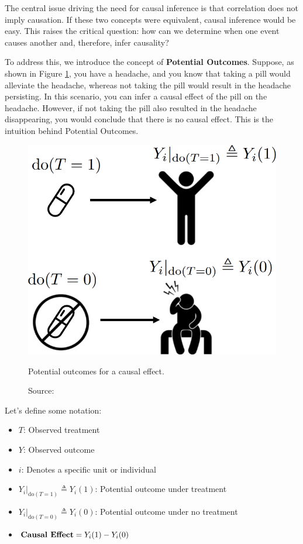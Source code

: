 The central issue driving the need for causal inference is that
correlation does not imply causation. If these two concepts were equivalent,
causal inference would be easy.
This raises the critical question: how can we determine when one
event causes another and, therefore, infer causality?

To address this, we introduce the concept of \textbf{Potential Outcomes}.
Suppose, as shown in Figure \ref{fig:potential_outcomes},
you have a headache, and you know that taking a pill would alleviate
the headache, whereas not taking the pill would result in the
headache persisting. In this scenario, you can infer a causal effect
of the pill on the headache. However, if not taking the pill
also resulted in the headache disappearing, you would conclude
that there is no causal effect.
This is the intuition behind Potential Outcomes.

\begin{figure}[h]
    \centering
    \includegraphics[width=.65\textwidth]{figures/ch3/11.potential.png}
    \caption{Potential outcomes for a causal effect.}
    \vspace{-10px}
    \caption*{\scriptsize{Source: \cite{Neal_2020a}}}
    \label{fig:potential_outcomes}
\end{figure}

Let's define some notation:
\begin{itemize}
    \item \( T \): Observed treatment
    \item \( Y \): Observed outcome
    \item \( i \): Denotes a specific unit or individual
    \item \( Y_i|_{\text{do}(T=1)} \triangleq Y_i(1) \): Potential outcome under treatment
    \item \( Y_i|_{\text{do}(T=0)} \triangleq Y_i(0) \): Potential outcome under no treatment
    \item \( \text{\textbf{Causal Effect}} = Y_i(1) - Y_i(0) \)
\end{itemize}


